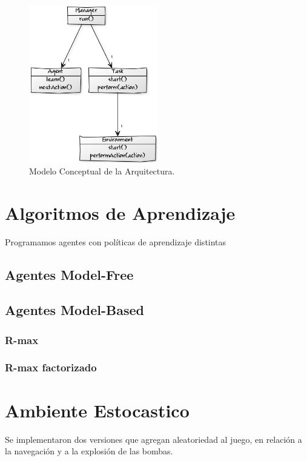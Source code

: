 \documentclass[a4paper,spanish] {article}
\begin{document}
	
	\begin{figure}[h!]
  \centering
    \includegraphics[width=0.5\textwidth]{MCarquitectra.png}
  \caption{Modelo Conceptual de la Arquitectura.}

	\end{figure}
\section{Algoritmos de Aprendizaje}


	Programamos agentes con pol\'iticas de aprendizaje distintas 
	\subsection{Agentes Model-Free}
		\newpage
		
	\subsection{Agentes Model-Based}	
		\subsubsection{R-max}
		\subsubsection{R-max factorizado}


\section{Ambiente Estocastico}

	Se implementaron dos versiones que agregan aleatoriedad al juego, en relaci\'on a la navegaci\'on y a la explosi\'on de las bombas.\\
	
\end{document}
